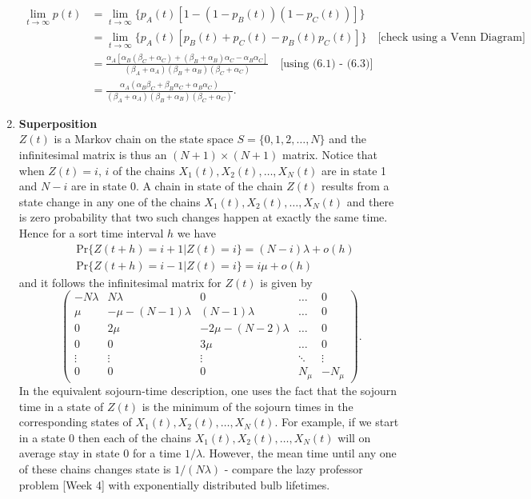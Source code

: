 \documentclass[11pt,a4paper]{article}
\begin{document}
\begin{enumerate}
    \begin{align*}
      \lim_{t\to\infty}p(t)
      &= \lim_{t\to\infty}\{p_A(t)[1 - (1 - p_B(t))(1 - p_C(t))]\}\\
      &= \lim_{t\to\infty}\{p_A(t)[p_B(t) + p_C(t) - p_B(t)p_C(t)]\}\quad \text{[check using a Venn Diagram]}\\
      &= \frac{\alpha_A[\alpha_B(\beta_C + \alpha_C) + (\beta_B + \alpha_B)\alpha_C - \alpha_B\alpha_C]}{(\beta_A + \alpha_A)(\beta_B + \alpha_B)(\beta_C + \alpha_C)}\quad\text{[using (6.1) - (6.3)]}\\
      &= \frac{\alpha_A(\alpha_B\beta_C + \beta_B\alpha_C + \alpha_B\alpha_C)}{(\beta_A + \alpha_A)(\beta_B + \alpha_B)(\beta_C + \alpha_C)}.
    \end{align*}
    \item \textbf{Superposition}\\
    $Z(t)$ is a Markov chain on the state space $S = \{0, 1, 2,\ldots, N\}$ and the infinitesimal matrix is thus an $(N + 1)\times (N + 1)$ matrix. Notice that when $Z(t) = i$, $i$ of the chains $X_1(t), X_2(t),\ldots,X_N(t)$ are in state 1 and $N - i$ are in state 0. A chain in state of the chain $Z(t)$ results from a state change in any one of the chains $X_1(t), X_2(t),\ldots,X_N(t)$ and there is zero probability that two such changes happen at exactly the same time. Hence for a sort time interval $h$ we have
    \begin{align*}
      &\text{Pr}\{Z(t + h) = i + 1|Z(t) = i\} = (N - i)\lambda + o(h)\\
      &\text{Pr}\{Z(t + h) = i - 1|Z(t) = i\} = i\mu + o(h)
    \end{align*}
    and it follows the infinitesimal matrix for $Z(t)$ is given by
    $$
    \begin{pmatrix}
      -N\lambda & N\lambda & 0 & \ldots & 0\\
      \mu & -\mu - (N - 1)\lambda & (N - 1)\lambda & \ldots & 0\\
      0 & 2\mu & -2\mu - (N - 2)\lambda & \ldots & 0\\
      0 & 0 & 3\mu & \ldots & 0\\
      \vdots & \vdots & \vdots & \ddots & \vdots\\
      0 & 0 & 0 & N_\mu & -N_\mu
    \end{pmatrix}.
    $$
    In the equivalent sojourn-time description, one uses the fact that the sojourn time in a state of $Z(t)$ is the minimum of the sojourn times in the corresponding states of $X_1(t), X_2(t),\ldots, X_N(t)$. For example, if we start in a state 0 then each of the chains $X_1(t), X_2(t),\ldots, X_N(t)$ will on average stay in state 0 for a time $1/\lambda$. However, the mean time until any one of these chains changes state is $1/(N\lambda)$ - compare the lazy professor problem [Week 4] with exponentially distributed bulb lifetimes.

\end{enumerate}
\end{document}
